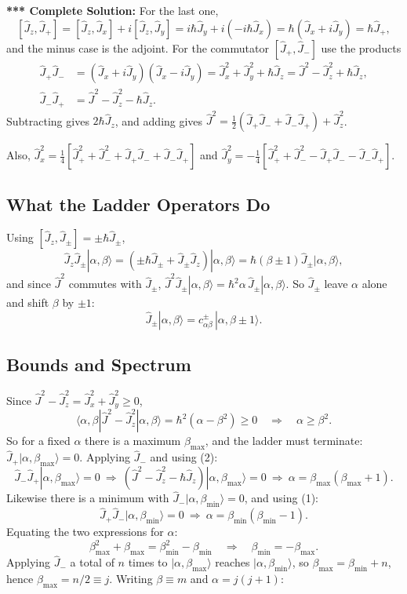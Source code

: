 \documentclass[11pt,a4paper]{article}
\begin{document}
\textbf{*** Complete Solution:} For the last one,
\[
[\hat J_z,\hat J_+]=[\hat J_z,\hat J_x]+i[\hat J_z,\hat J_y]=i\hbar\hat J_y+i(-i\hbar\hat J_x)=\hbar(\hat J_x+i\hat J_y)=\hbar\hat J_+ ,
\]
and the minus case is the adjoint. For the commutator $[\hat J_+,\hat J_-]$ use the products
\begin{align*}
\hat J_+\hat J_-&=(\hat J_x+i\hat J_y)(\hat J_x-i\hat J_y)=\hat J_x^2+\hat J_y^2+\hbar\hat J_z=\hat J^2-\hat J_z^2+\hbar\hat J_z,\tag{1}\\
\hat J_-\hat J_+&=\hat J^2-\hat J_z^2-\hbar\hat J_z.\tag{2}
\end{align*}
Subtracting gives $2\hbar\hat J_z$, and adding gives $\hat J^2=\tfrac12(\hat J_+\hat J_-+\hat J_-\hat J_+)+\hat J_z^2$.

Also, $\hat J_x^2=\tfrac14[\hat J_+^2+\hat J_-^2+\hat J_+\hat J_-+\hat J_-\hat J_+]$ and $\hat J_y^2=-\tfrac14[\hat J_+^2+\hat J_-^2-\hat J_+\hat J_--\hat J_-\hat J_+]$.

\subsection{What the Ladder Operators Do}
Using $[\hat J_z,\hat J_\pm]=\pm\hbar\hat J_\pm$,
\[
\hat J_z\hat J_\pm|\alpha,\beta\rangle=(\pm\hbar\hat J_\pm+\hat J_\pm\hat J_z)|\alpha,\beta\rangle=\hbar(\beta\pm1)\hat J_\pm|\alpha,\beta\rangle ,
\]
and since $\hat J^2$ commutes with $\hat J_\pm$, $\hat J^2\hat J_\pm|\alpha,\beta\rangle=\hbar^2\alpha\,\hat J_\pm|\alpha,\beta\rangle$. So $\hat J_\pm$ leave $\alpha$ alone and shift $\beta$ by $\pm1$:
\[
\hat J_\pm|\alpha,\beta\rangle=c^{\pm}_{\alpha\beta}\,|\alpha,\beta\pm1\rangle .
\]

\subsection{Bounds and Spectrum}
Since $\hat J^2-\hat J_z^2=\hat J_x^2+\hat J_y^2\ge0$,
\[
\langle\alpha,\beta|\hat J^2-\hat J_z^2|\alpha,\beta\rangle=\hbar^2(\alpha-\beta^2)\ge0\quad\Longrightarrow\quad\alpha\ge\beta^2 .
\]
So for a fixed $\alpha$ there is a maximum $\beta_{\max}$, and the ladder must terminate: $\hat J_+|\alpha,\beta_{\max}\rangle=0$. Applying $\hat J_-$ and using (2):
\[
\hat J_-\hat J_+|\alpha,\beta_{\max}\rangle=0\ \Rightarrow\ (\hat J^2-\hat J_z^2-\hbar\hat J_z)|\alpha,\beta_{\max}\rangle=0\ \Rightarrow\ \alpha=\beta_{\max}(\beta_{\max}+1).
\]
Likewise there is a minimum with $\hat J_-|\alpha,\beta_{\min}\rangle=0$, and using (1):
\[
\hat J_+\hat J_-|\alpha,\beta_{\min}\rangle=0\ \Rightarrow\ \alpha=\beta_{\min}(\beta_{\min}-1).
\]
Equating the two expressions for $\alpha$:
\[
\beta_{\max}^2+\beta_{\max}=\beta_{\min}^2-\beta_{\min}\quad\Longrightarrow\quad \beta_{\min}=-\beta_{\max}.
\]
Applying $\hat J_-$ a total of $n$ times to $|\alpha,\beta_{\max}\rangle$ reaches $|\alpha,\beta_{\min}\rangle$, so $\beta_{\max}=\beta_{\min}+n$, hence $\beta_{\max}=n/2\equiv j$. Writing $\beta\equiv m$ and $\alpha=j(j+1)$:
\end{document}

